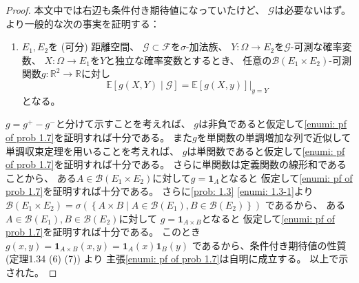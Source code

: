 \documentclass[uplatex]{jsarticle}
\theoremstyle{definition}
\def\R{\mathbb{R}}
\def\E{\mathbb{E}}
\def\I{\mathbf{1}}
\def\mcB{\mathcal{B}}
\def\mcF{\mathcal{F}}
\def\mcG{\mathcal{G}}
\begin{document}
\begin{proof}
  本文中では右辺も条件付き期待値になっていたけど、
  \(\mcG\)は必要ないはず。
  より一般的な次の事実を証明する：
  \begin{enumerate}[label=(\fnsymbol*), start=2]
    \item \label{enumi: pf of prob 1.7}
    \(E_1,E_2\)を (可分) 距離空間、
    \(\mcG\subset \mcF\)を\(\sigma\)-加法族、
    \(Y:\Omega \to E_2\)を\(\mcG\)-可測な確率変数、
    \(X:\Omega \to E_1\)を\(Y\)と独立な確率変数とするとき、
    任意の\(\mcB(E_1\times E_2)\)-可測関数\(g:\R^2\to \R\)に対し
    \[
    \E\left[ g(X,Y)\middle| \mcG\right]
    = \E\left[ g(X,y) \right]|_{y=Y}
    \]
    となる。
  \end{enumerate}

  \(g=g^+-g^-\)と分けて示すことを考えれば、
  \(g\)は非負であると仮定して\ref{enumi: pf of prob 1.7}を証明すれば十分である。
  また\(g\)を単関数の単調増加な列で近似して単調収束定理を用いることを考えれば、
  \(g\)は単関数であると仮定して\ref{enumi: pf of prob 1.7}を証明すれば十分である。
  さらに単関数は定義関数の線形和であることから、
  ある\(A\in \mcB(E_1\times E_2)\)に対して\(g = \I_A\)となると
  仮定して\ref{enumi: pf of prob 1.7}を証明すれば十分である。
  さらに\autoref{prob: 1.3} \ref{enumi: 1.3-1}より
  \(\mcB(E_1\times E_2) = \sigma\left(
  \left\{ A\times B \middle| A\in \mcB(E_1) , B\in \mcB(E_2)\right\}\right)\)
  であるから、
  ある\(A\in \mcB(E_1) , B\in \mcB(E_2)\)に対して
  \(g = \I_{A\times B}\)となると
  仮定して\ref{enumi: pf of prob 1.7}を証明すれば十分である。
  このとき\(g(x,y) = \I_{A\times B}(x,y) = \I_A(x) \I_B(y)\)
  であるから、条件付き期待値の性質 (定理1.34 (6) (7)) より
  主張\ref{enumi: pf of prob 1.7}は自明に成立する。
  以上で示された。
\end{proof}
\end{document}
